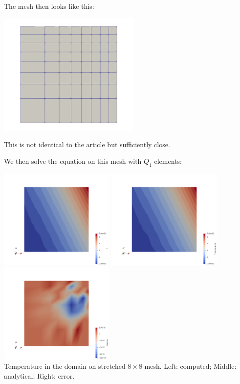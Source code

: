 The mesh then looks like this:

\begin{center}
\includegraphics[width=7cm]{python_codes/fieldstone_173/images/mesh8x8}
\end{center}
This is not identical to the article but sufficiently close.


We then solve the equation on this mesh with $Q_1$ elements:

\begin{center}
\includegraphics[width=5.7cm]{python_codes/fieldstone_173/results/exp1/T}
\includegraphics[width=5.7cm]{python_codes/fieldstone_173/results/exp1/T_analytical}
\includegraphics[width=5.7cm]{python_codes/fieldstone_173/results/exp1/T_error}\\
{\captionfont Temperature in the domain on stretched $8\times 8$ mesh. 
Left: computed; Middle: analytical; Right: error.}
\end{center}

